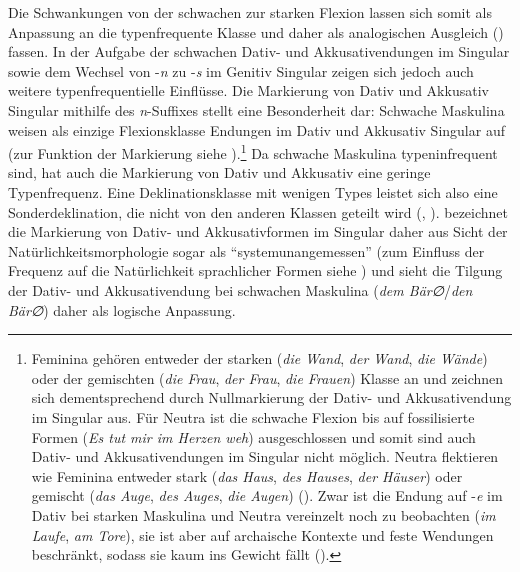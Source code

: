 Die Schwankungen von der schwachen zur starken Flexion lassen sich somit als Anpassung an die typenfrequente Klasse und daher als analogischen Ausgleich (\cite[66]{Bybee.2010}) fassen. In der Aufgabe der schwachen Dativ- und Akkusativendungen im Singular sowie dem Wechsel von -\textit{n} zu -\textit{s} im Genitiv Singular zeigen sich jedoch auch weitere typenfrequentielle Einflüsse. Die Markierung von Dativ und Akkusativ Singular mithilfe des \textit{n}-Suffixes stellt eine Besonderheit dar: Schwache Maskulina weisen als einzige Flexionsklasse Endungen im Dativ und Akkusativ Singular auf (zur Funktion der Markierung siehe ).\footnote{Feminina gehören entweder der starken (\textit{die Wand}, \textit{der Wand}, \textit{die Wände}) oder der gemischten (\textit{die Frau}, \textit{der Frau}, \textit{die Frauen}) Klasse an und zeichnen sich dementsprechend durch Nullmarkierung der Dativ- und Akkusativendung im Singular aus. Für Neutra ist die schwache Flexion bis auf fossilisierte Formen (\textit{Es tut mir im Herzen weh}) ausgeschlossen und somit sind auch Dativ- und Akkusativendungen im Singular nicht möglich. Neutra flektieren wie Feminina entweder stark (\textit{das Haus}, \textit{des Hauses}, \textit{der Häuser}) oder gemischt (\textit{das Auge}, \textit{des Auges}, \textit{die Augen}) (\cite[298--299]{Nubling.2008}). Zwar ist die Endung auf -\textit{e} im Dativ bei starken Maskulina und Neutra vereinzelt noch zu beobachten (\textit{im Laufe}, \textit{am Tore}), sie ist aber auf archaische Kontexte und feste Wendungen beschränkt, sodass sie kaum ins Gewicht fällt (\cite[153]{Eisenberg.2013}).}  Da schwache Maskulina typeninfrequent sind, hat auch die Markierung von Dativ und Akkusativ eine geringe Typenfrequenz. Eine Deklinationsklasse mit wenigen Types leistet sich also eine Sonderdeklination, die nicht von den anderen Klassen geteilt wird (\cite[113--114]{Thieroff.2003}, \cite[57]{Krischke.2012}). \textcite[96]{Wurzel.1984} bezeichnet die Markierung von Dativ- und Akkusativformen im Singular daher aus Sicht der Natürlichkeitsmorphologie sogar als "`systemunangemessen"' (zum Einfluss der Frequenz auf die Natürlichkeit sprachlicher Formen siehe \cite[86]{Wurzel.1984}) und sieht die Tilgung der Dativ- und Akkusativendung bei schwachen Maskulina (\textit{dem Bär∅}/\textit{den Bär∅}) daher als logische Anpassung. 

 

